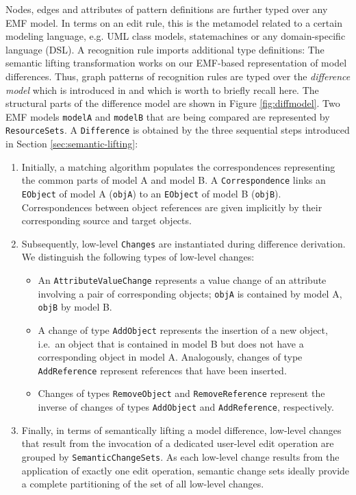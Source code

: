 \documentclass{llncs}
\begin{document}
Nodes, edges and attributes of pattern definitions are further typed over any EMF model.
In terms on an edit rule, this is the metamodel related to a certain modeling language, 
e.g. UML class models, statemachines or any domain-specific language (DSL).
A recognition rule imports additional type definitions:
The semantic lifting transformation works on our
EMF-based representation of model differences.
Thus, graph patterns of recognition rules are typed over 
the \textit{difference model} which is introduced in 
\cite{KeKT2011ASE} and which is worth to briefly recall here.
The structural parts of the difference model are shown
in Figure \ref{fig:diffmodel}.
Two EMF models \texttt{modelA} and \texttt{modelB} that are
being compared are represented by \texttt{ResourceSets}. 
A \texttt{Difference} is obtained by the three sequential steps
introduced in Section \ref{sec:semantic-lifting}:
\begin{enumerate}

  \item Initially, a matching algorithm populates
the correspondences representing the common parts of model
A and model B. A \texttt{Correspondence} links an \texttt{EObject} of model A 
(\texttt{objA}) to an \texttt{EObject} of model B (\texttt{objB}).
Correspondences between object references are given implicitly by
their corresponding source and target objects.

  \item Subsequently, low-level \texttt{Changes} are instantiated during
difference derivation. We distinguish the following types of 
low-level changes:

\begin{itemize}
\item An \texttt{AttributeValueChange} represents a value change
  of an attribute involving a pair of corresponding objects; \texttt{objA} is
  contained by model A, \texttt{objB} by model B.

\item A change of type \texttt{AddObject} represents the
  insertion of a new object, i.e.\ an object that is contained in
  model B but does not have a corresponding object in model A.
  Analogously, changes of type \texttt{AddReference} represent references
  that have been inserted. 

\item Changes of types \texttt{RemoveObject} and
  \texttt{RemoveReference} represent the inverse of
  changes of types \texttt{AddObject} and
  \texttt{AddReference}, respectively.

\end{itemize} 

  \item Finally, in terms of semantically lifting a model difference, low-level
changes that result from the invocation of a dedicated user-level
edit operation are grouped by \texttt{SemanticChangeSets}.
As each low-level change results from the application of
exactly one edit operation, semantic change sets ideally
provide a complete partitioning of the set of all low-level
changes.

\end{enumerate}
\end{document}
